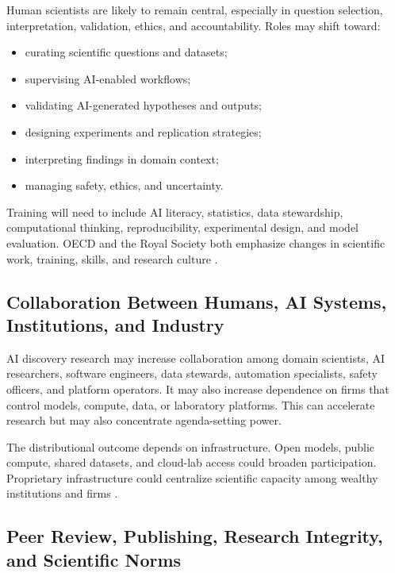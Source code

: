 \documentclass[12pt]{article}
\begin{document}
Human scientists are likely to remain central, especially in question selection, interpretation, validation, ethics, and accountability. Roles may shift toward:
\begin{itemize}[leftmargin=*]
    \item curating scientific questions and datasets;
    \item supervising AI-enabled workflows;
    \item validating AI-generated hypotheses and outputs;
    \item designing experiments and replication strategies;
    \item interpreting findings in domain context;
    \item managing safety, ethics, and uncertainty.
\end{itemize}

Training will need to include AI literacy, statistics, data stewardship, computational thinking, reproducibility, experimental design, and model evaluation. OECD and the Royal Society both emphasize changes in scientific work, training, skills, and research culture \cite{ref2,ref4}.

\subsection{Collaboration Between Humans, AI Systems, Institutions, and Industry}

AI discovery research may increase collaboration among domain scientists, AI researchers, software engineers, data stewards, automation specialists, safety officers, and platform operators. It may also increase dependence on firms that control models, compute, data, or laboratory platforms. This can accelerate research but may also concentrate agenda-setting power.

The distributional outcome depends on infrastructure. Open models, public compute, shared datasets, and cloud-lab access could broaden participation. Proprietary infrastructure could centralize scientific capacity among wealthy institutions and firms \cite{ref2,ref4}.

\subsection{Peer Review, Publishing, Research Integrity, and Scientific Norms}
\end{document}
